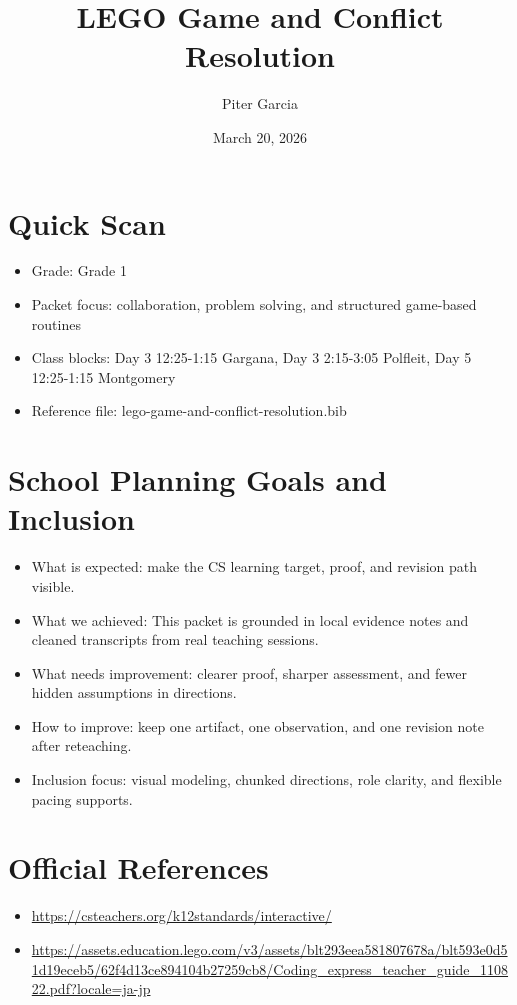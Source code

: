 \documentclass[11pt]{article}
\title{LEGO Game and Conflict Resolution}
\author{Piter Garcia}
\date{March 20, 2026}
\begin{document}
\maketitle
\section*{Quick Scan}
\begin{itemize}[leftmargin=*]
\item Grade: Grade 1
\item Packet focus: collaboration, problem solving, and structured game-based routines
\item Class blocks: Day 3 12:25-1:15 Gargana, Day 3 2:15-3:05 Polfleit, Day 5 12:25-1:15 Montgomery
\item Reference file: lego-game-and-conflict-resolution.bib
\end{itemize}
\section*{School Planning Goals and Inclusion}
\begin{itemize}[leftmargin=*]
\item What is expected: make the CS learning target, proof, and revision path visible.
\item What we achieved: This packet is grounded in local evidence notes and cleaned transcripts from real teaching sessions.
\item What needs improvement: clearer proof, sharper assessment, and fewer hidden assumptions in directions.
\item How to improve: keep one artifact, one observation, and one revision note after reteaching.
\item Inclusion focus: visual modeling, chunked directions, role clarity, and flexible pacing supports.
\end{itemize}
\section*{Official References}
\begin{itemize}[leftmargin=*]
\item \url{https://csteachers.org/k12standards/interactive/}
\item \url{https://assets.education.lego.com/v3/assets/blt293eea581807678a/blt593e0d51d19eceb5/62f4d13ce894104b27259cb8/Coding_express_teacher_guide_110822.pdf?locale=ja-jp}
\end{itemize}
\end{document}
